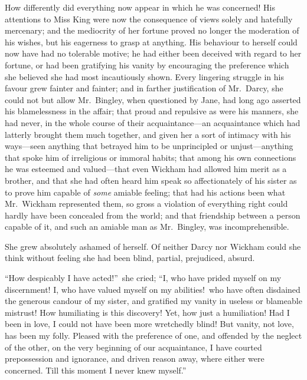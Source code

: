 \documentclass[12pt,english]{book}
\begin{document}
How differently did everything now appear in which he was concerned!
His attentions to Miss King were now the consequence of views solely
and hatefully mercenary; and the mediocrity of her fortune proved
no longer the moderation of his wishes, but his eagerness to grasp
at anything. His behaviour to herself could now have had no tolerable
motive; he had either been deceived with regard to her fortune, or
had been gratifying his vanity by encouraging the preference which
she believed she had most incautiously shown. Every lingering struggle
in his favour grew fainter and fainter; and in farther justification
of Mr.\ Darcy, she could not but allow Mr.\ Bingley, when questioned
by Jane, had long ago asserted his blamelessness in the affair; that
proud and repulsive as were his manners, she had never, in the whole
course of their acquaintance\mbox{---}an acquaintance which had latterly
brought them much together, and given her a sort of intimacy with
his ways\mbox{---}seen anything that betrayed him to be unprincipled
or unjust\mbox{---}anything that spoke him of irreligious or immoral
habits; that among his own connections he was esteemed and valued\mbox{---}that
even Wickham had allowed him merit as a brother, and that she had
often heard him speak so affectionately of his sister as to prove
him capable of \textit{some} amiable feeling; that had his actions
been what Mr.\ Wickham represented them, so gross a violation of
everything right could hardly have been concealed from the world;
and that friendship between a person capable of it, and such an amiable
man as Mr.\ Bingley, was incomprehensible.

She grew absolutely ashamed of herself. Of neither Darcy nor Wickham
could she think without feeling she had been blind, partial, prejudiced,
absurd.

{}``How despicably I have acted!''\ she cried; {}``I, who have
prided myself on my discernment! I, who have valued myself on my abilities!\ who
have often disdained the generous candour of my sister, and gratified
my vanity in useless or blameable mistrust! How humiliating is this
discovery! Yet, how just a humiliation! Had I been in love, I could
not have been more wretchedly blind! But vanity, not love, has been
my folly. Pleased with the preference of one, and offended by the
neglect of the other, on the very beginning of our acquaintance, I
have courted prepossession and ignorance, and driven reason away,
where either were concerned. Till this moment I never knew myself.''
\end{document}
